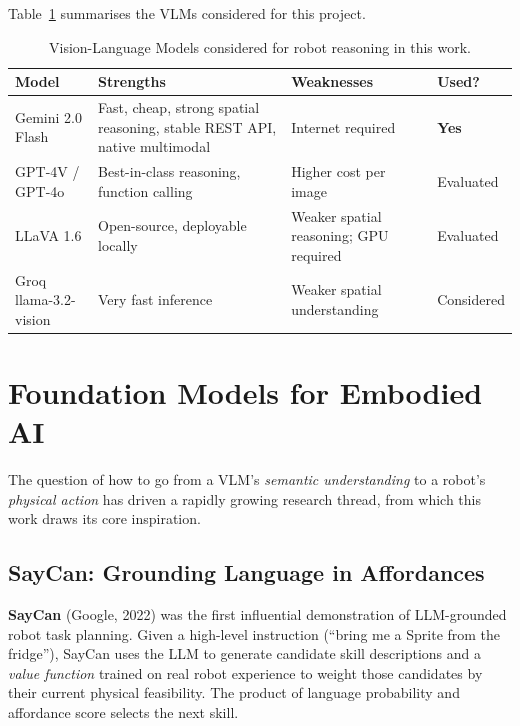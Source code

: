 Table~\ref{tab:vlm_comparison} summarises the VLMs considered for this project.

\begin{table}[H]
\centering
\caption{Vision-Language Models considered for robot reasoning in this work.}
\label{tab:vlm_comparison}
\begin{tabularx}{\linewidth}{lXXl}
\toprule
\textbf{Model} & \textbf{Strengths} & \textbf{Weaknesses} & \textbf{Used?} \\
\midrule
Gemini 2.0 Flash & Fast, cheap, strong spatial reasoning, stable REST API,
                   native multimodal & Internet required & \textbf{Yes} \\
GPT-4V / GPT-4o  & Best-in-class reasoning, function calling & Higher cost per image & Evaluated \\
LLaVA 1.6        & Open-source, deployable locally & Weaker spatial reasoning; GPU required & Evaluated \\
Groq llama-3.2-vision & Very fast inference & Weaker spatial understanding & Considered \\
\bottomrule
\end{tabularx}
\end{table}

\section{Foundation Models for Embodied AI}
\label{sec:embodied}

The question of how to go from a VLM's \emph{semantic understanding} to a robot's
\emph{physical action} has driven a rapidly growing research thread, from which this
work draws its core inspiration.

\subsection{SayCan: Grounding Language in Affordances}

\textbf{SayCan} \cite{ahn2022saycan} (Google, 2022) was the first influential
demonstration of LLM-grounded robot task planning.
Given a high-level instruction (``bring me a Sprite from the fridge''), SayCan uses
the LLM to generate candidate skill descriptions and a \emph{value function} trained
on real robot experience to weight those candidates by their current physical
feasibility.
The product of language probability and affordance score selects the next skill.

